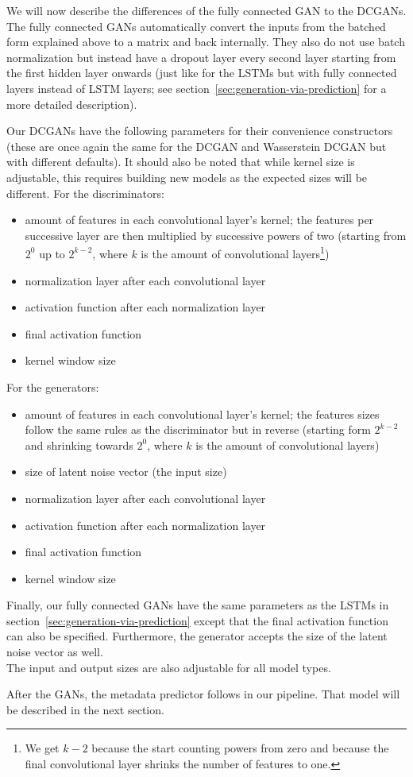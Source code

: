 We will now describe the differences of the fully connected GAN to the
DCGANs. The fully connected GANs automatically convert the inputs from
the batched form explained above to a matrix and back internally. They
also do not use batch normalization but instead have a dropout layer
every second layer starting from the first hidden layer onwards (just
like for the LSTMs but with fully connected layers instead of LSTM
layers; see section~\ref{sec:generation-via-prediction} for a more
detailed description).

Our DCGANs have the following parameters for their convenience
constructors (these are once again the same for the DCGAN and
Wasserstein DCGAN but with different defaults). It should also be
noted that while kernel size is adjustable, this requires building new
models as the expected sizes will be different. For the discriminators:
\begin{itemize}
\item amount of features in each convolutional layer's kernel; the
  features per successive layer are then multiplied by successive
  powers of two (starting from $2^{0}$ up to $2^{k - 2}$, where $k$ is
  the amount of convolutional layers\footnote{We get $k - 2$ because
    the start counting powers from zero and because the final
    convolutional layer shrinks the number of features to one.})
\item normalization layer after each convolutional layer
\item activation function after each normalization layer
\item final activation function
\item kernel window size
\end{itemize}
For the generators:
\begin{itemize}
\item amount of features in each convolutional layer's kernel; the
  features sizes follow the same rules as the discriminator but in
  reverse (starting form $2^{k - 2}$ and shrinking towards $2^{0}$,
  where $k$ is the amount of convolutional layers)
\item size of latent noise vector (the input size)
\item normalization layer after each convolutional layer
\item activation function after each normalization layer
\item final activation function
\item kernel window size
\end{itemize}
Finally, our fully connected GANs have the same parameters as the
LSTMs in section~\ref{sec:generation-via-prediction} except that the
final activation function can also be specified. Furthermore, the
generator accepts the size of the latent noise vector as well. \\
The input and output sizes are also adjustable for all model types.

After the GANs, the metadata predictor follows in our pipeline. That
model will be described in the next section.


